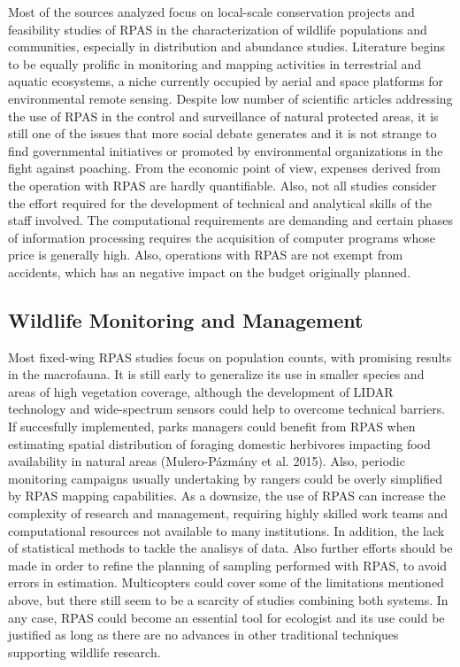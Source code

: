 \documentclass[]{interact}
\theoremstyle{plain}%
\theoremstyle{definition}
\theoremstyle{remark}
\begin{document}
Most of the sources analyzed focus on local-scale conservation projects
and feasibility studies of RPAS in the characterization of wildlife
populations and communities, especially in distribution and abundance
studies. Literature begins to be equally prolific in monitoring and
mapping activities in terrestrial and aquatic ecosystems, a niche
currently occupied by aerial and space platforms for environmental
remote sensing. Despite low number of scientific articles addressing the
use of RPAS in the control and surveillance of natural protected areas,
it is still one of the issues that more social debate generates and it
is not strange to find governmental initiatives or promoted by
environmental organizations in the fight against poaching. From the
economic point of view, expenses derived from the operation with RPAS
are hardly quantifiable. Also, not all studies consider the effort
required for the development of technical and analytical skills of the
staff involved. The computational requirements are demanding and certain
phases of information processing requires the acquisition of computer
programs whose price is generally high. Also, operations with RPAS are
not exempt from accidents, which has an negative impact on the budget
originally planned.

\subsection{Wildlife Monitoring and
Management}\label{wildlife-monitoring-and-management-1}

Most fixed-wing RPAS studies focus on population counts, with promising
results in the macrofauna. It is still early to generalize its use in
smaller species and areas of high vegetation coverage, although the
development of LIDAR technology and wide-spectrum sensors could help to
overcome technical barriers. If succesfully implemented, parks managers
could benefit from RPAS when estimating spatial distribution of foraging
domestic herbivores impacting food availability in natural areas
(Mulero-Pázmány et al. 2015). Also, periodic monitoring campaigns
usually undertaking by rangers could be overly simplified by RPAS
mapping capabilities. As a downsize, the use of RPAS can increase the
complexity of research and management, requiring highly skilled work
teams and computational resources not available to many institutions. In
addition, the lack of statistical methods to tackle the analisys of
data. Also further efforts should be made in order to refine the
planning of sampling performed with RPAS, to avoid errors in estimation.
Multicopters could cover some of the limitations mentioned above, but
there still seem to be a scarcity of studies combining both systems. In
any case, RPAS could become an essential tool for ecologist and its use
could be justified as long as there are no advances in other traditional
techniques supporting wildlife research.
\end{document}
